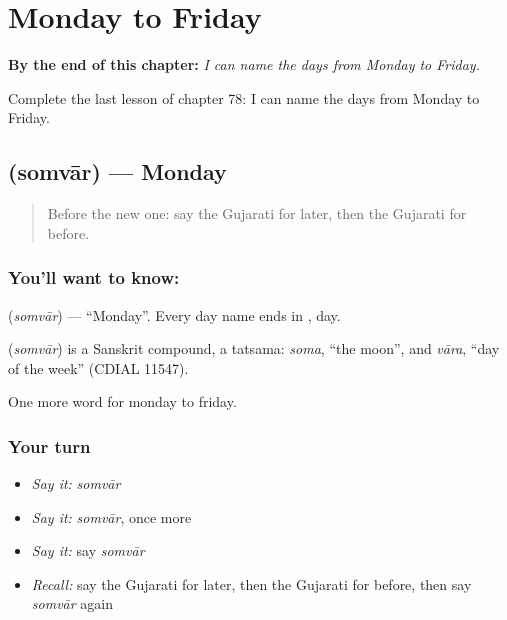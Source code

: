 
\chapter{Monday to Friday}
\label{ch:gu-monday-to-friday}

\begin{chapteropening}
\textbf{By the end of this chapter:} \emph{I can name the days from Monday to Friday.}

Complete the last lesson of chapter 78: I can name the days from Monday to Friday.
\end{chapteropening}

\section[\texorpdfstring{\gu{સોમવાર} (somvār)}{સોમવાર (somvār)}]{ (somvār) — Monday}

\label{lesson:GU-C78-monday}



\begin{quote}
Before the new one: say the Gujarati for later, then the Gujarati for before.
\end{quote}

\subsection*{You'll want to know: }
\textbf{} (\emph{somvār}) — \textquotedblleft{}Monday\textquotedblright{}. Every day name ends in \textbf{}, day.

\begin{cousinweb}
\textbf{} (\emph{somvār}) is a Sanskrit compound, a tatsama: \emph{soma}, \textquotedblleft{}the moon\textquotedblright{}, and \emph{vāra}, \textquotedblleft{}day of the week\textquotedblright{} (CDIAL 11547).
\end{cousinweb}

\begin{grammarlens}[title={What you've built}]
One more word for monday to friday.
\end{grammarlens}

\subsection*{Your turn}
\begin{itemize}
\raggedright
  \item \emph{Say it:} \emph{somvār}
  \item \emph{Say it:} \emph{somvār}, once more
  \item \emph{Say it:} say \emph{somvār}
  \item \emph{Recall:} say the Gujarati for later, then the Gujarati for before, then say \emph{somvār} again
\end{itemize}

